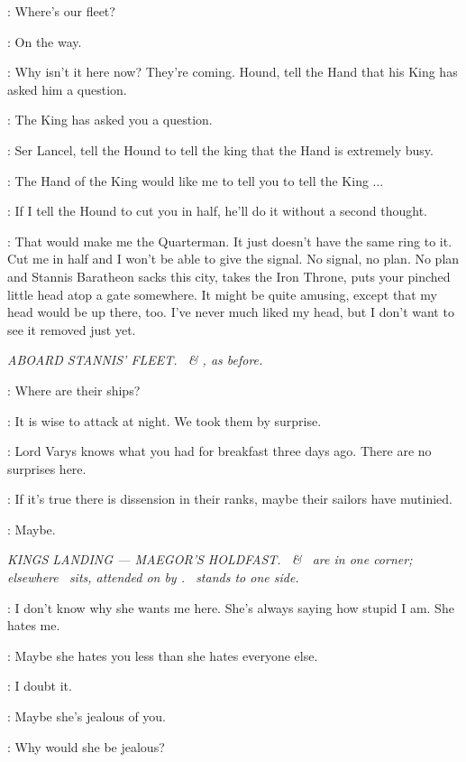 \LANCEL: Where's our fleet? 

\TYRION: On the way. 

\JOFFREY: Why isn't it here now? They're coming. Hound, tell the Hand that his King has asked him a question. 

\HOUND: The King has asked you a question. 

\TYRION: Ser Lancel, tell the Hound to tell the king that the Hand is extremely busy. 

\LANCEL: The Hand of the King would like me to tell you to tell the King $\ldots$  

\JOFFREY: If I tell the Hound to cut you in half, he'll do it without a second thought. 

\TYRION: That would make me the Quarterman. 
It just doesn't have the same ring to it. 
Cut me in half and I won't be able to give the signal. 
No signal, no plan. 
No plan and Stannis Baratheon sacks this city, takes the Iron Throne, puts your pinched little head atop a gate somewhere. 
It might be quite amusing, except that my head would be up there, too. 
I've never much liked my head, but I don't want to see it removed just yet. 


\scene

\textit{ABOARD STANNIS' FLEET. \DAVOS ~\& \MATTHOS, as before.} 

\DAVOS: Where are their ships? 

\MATTHOS: It is wise to attack at night. We took them by surprise. 

\DAVOS: Lord Varys knows what you had for breakfast three days ago. 
There are no surprises here. 

\MATTHOS: If it's true there is dissension in their ranks, maybe their sailors have mutinied. 

\DAVOS: Maybe. 


\scene

\textit{KINGS LANDING --- MAEGOR'S HOLDFAST. \SANSA ~\& \SHAE ~are in
one corner; elsewhere \CERSEI ~sits, attended on by \SGNS. \SERI
~stands to one side.} 

\SANSA: I don't know why she wants me here. 
She's always saying how stupid I am. She hates me. 

\SHAE: Maybe she hates you less than she hates everyone else. 

\SANSA: I doubt it. 

\SHAE: Maybe she's jealous of you. 

\SANSA: Why would she be jealous? 

